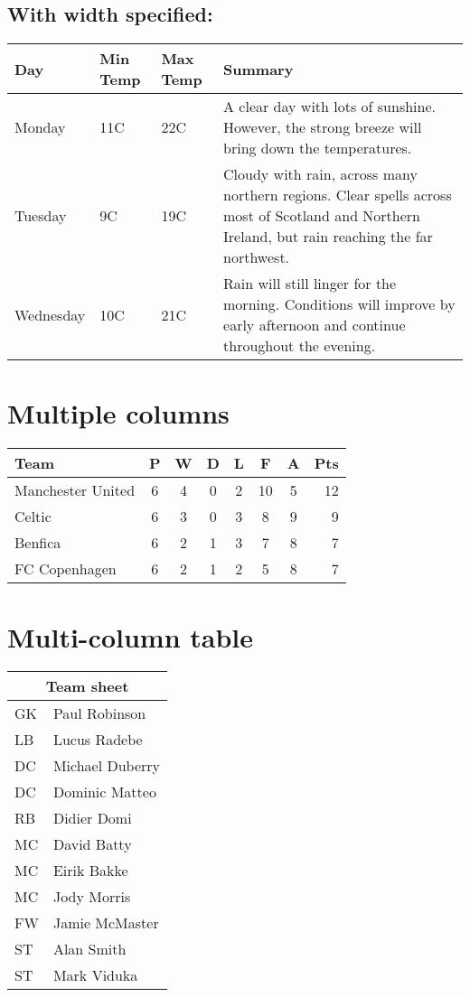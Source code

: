 \documentclass{article}
\begin{document}
\subsection{ With width specified:}

\begin{center}
    \begin{tabular}{ | l | l | l | p{5cm} |}
    \hline
    Day & Min Temp & Max Temp & Summary \\ \hline
    Monday & 11C & 22C & A clear day with lots of sunshine.  
    However, the strong breeze will bring down the temperatures. \\ \hline
    Tuesday & 9C & 19C & Cloudy with rain, across many northern regions. Clear spells
    across most of Scotland and Northern Ireland,
    but rain reaching the far northwest. \\ \hline
    Wednesday & 10C & 21C & Rain will still linger for the morning.
    Conditions will improve by early afternoon and continue
    throughout the evening. \\ \hline
    \end{tabular}
\end{center}

\section{Multiple columns}
\begin{tabular}{l|*{6}{c}|r|}
Team              & P & W & D & L & F  & A & Pts \\
\hline
Manchester United & 6 & 4 & 0 & 2 & 10 & 5 & 12  \\
Celtic            & 6 & 3 & 0 & 3 &  8 & 9 &  9  \\
Benfica           & 6 & 2 & 1 & 3 &  7 & 8 &  7  \\
FC Copenhagen     & 6 & 2 & 1 & 2 &  5 & 8 &  7  \\
\end{tabular}


\section{Multi-column table}
\begin{tabular}{|l|l|}
  \hline
  \multicolumn{2}{|c|}{Team sheet} \\
  \hline
  GK & Paul Robinson \\
  LB & Lucus Radebe \\
  DC & Michael Duberry \\
  DC & Dominic Matteo \\
  RB & Didier Domi \\
  MC & David Batty \\
  MC & Eirik Bakke \\
  MC & Jody Morris \\
  FW & Jamie McMaster \\
  ST & Alan Smith \\
  ST & Mark Viduka \\
  \hline
\end{tabular}
\end{document}
